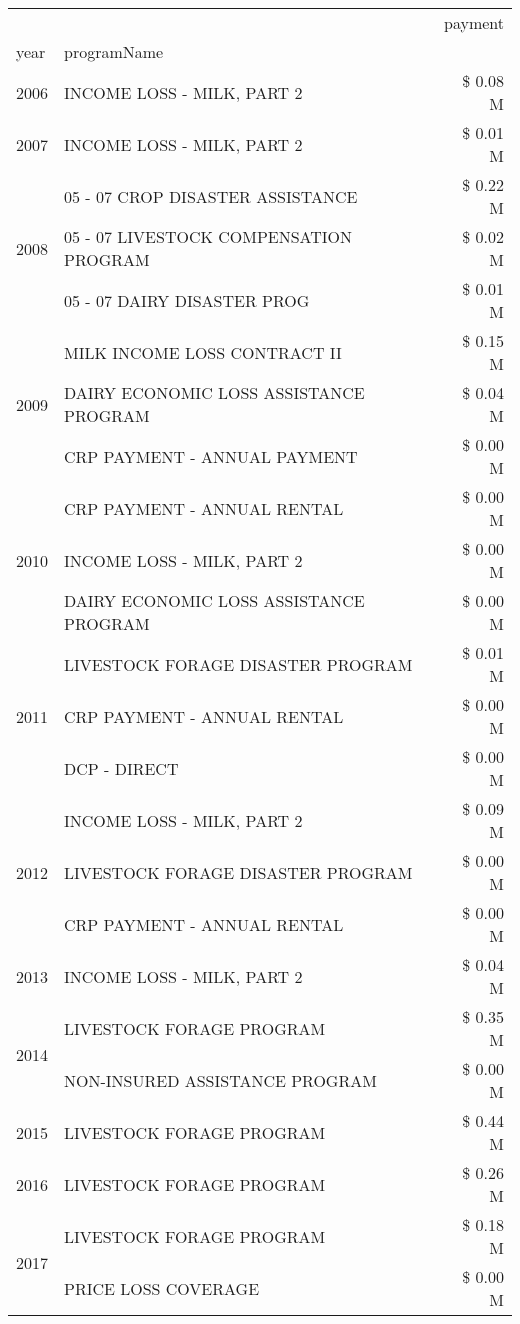 \begin{tabular}{llr}
\toprule
 &  & payment \\
year & programName &  \\
\midrule
2006 & INCOME LOSS - MILK, PART 2 & \$ 0.08 M \\
\cline{1-3}
2007 & INCOME LOSS - MILK, PART 2 & \$ 0.01 M \\
\cline{1-3}
\multirow[t]{3}{*}{2008} & 05 - 07 CROP DISASTER ASSISTANCE & \$ 0.22 M \\
 & 05 - 07 LIVESTOCK COMPENSATION PROGRAM & \$ 0.02 M \\
 & 05 - 07 DAIRY DISASTER PROG & \$ 0.01 M \\
\cline{1-3}
\multirow[t]{3}{*}{2009} & MILK INCOME LOSS CONTRACT II & \$ 0.15 M \\
 & DAIRY ECONOMIC LOSS ASSISTANCE PROGRAM & \$ 0.04 M \\
 & CRP PAYMENT - ANNUAL PAYMENT & \$ 0.00 M \\
\cline{1-3}
\multirow[t]{3}{*}{2010} & CRP PAYMENT - ANNUAL RENTAL & \$ 0.00 M \\
 & INCOME LOSS - MILK, PART 2 & \$ 0.00 M \\
 & DAIRY ECONOMIC LOSS ASSISTANCE PROGRAM & \$ 0.00 M \\
\cline{1-3}
\multirow[t]{3}{*}{2011} & LIVESTOCK FORAGE DISASTER PROGRAM & \$ 0.01 M \\
 & CRP PAYMENT - ANNUAL RENTAL & \$ 0.00 M \\
 & DCP - DIRECT & \$ 0.00 M \\
\cline{1-3}
\multirow[t]{3}{*}{2012} & INCOME LOSS - MILK, PART 2 & \$ 0.09 M \\
 & LIVESTOCK FORAGE DISASTER PROGRAM & \$ 0.00 M \\
 & CRP PAYMENT - ANNUAL RENTAL & \$ 0.00 M \\
\cline{1-3}
2013 & INCOME LOSS - MILK, PART 2 & \$ 0.04 M \\
\cline{1-3}
\multirow[t]{2}{*}{2014} & LIVESTOCK FORAGE PROGRAM & \$ 0.35 M \\
 & NON-INSURED ASSISTANCE PROGRAM & \$ 0.00 M \\
\cline{1-3}
2015 & LIVESTOCK FORAGE PROGRAM & \$ 0.44 M \\
\cline{1-3}
2016 & LIVESTOCK FORAGE PROGRAM & \$ 0.26 M \\
\cline{1-3}
\multirow[t]{2}{*}{2017} & LIVESTOCK FORAGE PROGRAM & \$ 0.18 M \\
 & PRICE LOSS COVERAGE & \$ 0.00 M \\

\end{tabular}
